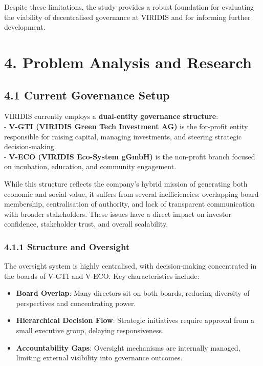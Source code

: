 \documentclass[
  english,
  12pt,
  oneside,
  open=any]{scrbook}
\providecommand{\tightlist}{%
  \setlength{\itemsep}{0pt}\setlength{\parskip}{0pt}}\usepackage{longtable,booktabs,array}
\begin{document}
Despite these limitations, the study provides a robust foundation for
evaluating the viability of decentralised governance at VIRIDIS and for
informing further development.

\chapter{4. Problem Analysis and Research}\label{sec-analysis}

\section{4.1 Current Governance Setup}\label{sec-current-gov}

VIRIDIS currently employs a \textbf{dual-entity governance structure}:\\
- \textbf{V-GTI (VIRIDIS Green Tech Investment AG)} is the for-profit
entity responsible for raising capital, managing investments, and
steering strategic decision-making.\\
- \textbf{V-ECO (VIRIDIS Eco-System gGmbH)} is the non-profit branch
focused on incubation, education, and community engagement.

While this structure reflects the company's hybrid mission of generating
both economic and social value, it suffers from several inefficiencies:
overlapping board membership, centralisation of authority, and lack of
transparent communication with broader stakeholders. These issues have a
direct impact on investor confidence, stakeholder trust, and overall
scalability.

\subsection{4.1.1 Structure and Oversight}\label{sec-oversight}

The oversight system is highly centralised, with decision-making
concentrated in the boards of V-GTI and V-ECO. Key characteristics
include:

\begin{itemize}
\tightlist
\item
  \textbf{Board Overlap}: Many directors sit on both boards, reducing
  diversity of perspectives and concentrating power.\\
\item
  \textbf{Hierarchical Decision Flow}: Strategic initiatives require
  approval from a small executive group, delaying responsiveness.\\
\item
  \textbf{Accountability Gaps}: Oversight mechanisms are internally
  managed, limiting external visibility into governance outcomes.
\end{itemize}
\end{document}
